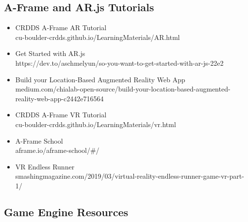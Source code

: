 \documentclass{article}
\begin{document}
\subsection{A-Frame and AR.js Tutorials}
\begin{itemize}
    \item CRDDS A-Frame AR Tutorial\\
    cu-boulder-crdds.github.io/LearningMaterials/AR.html
    \item Get Started with AR.js\\
    https://dev.to/aschmelyun/so-you-want-to-get-started-with-ar-js-22e2
    \item Build your Location-Based Augmented Reality Web App\\
    medium.com/chialab-open-source/build-your-location-based-augmented-reality-web-app-c2442e716564
    \item CRDDS A-Frame VR Tutorial\\
    cu-boulder-crdds.github.io/LearningMaterials/vr.html
    \item A-Frame School\\
    aframe.io/aframe-school/\#/
    \item VR Endless Runner\\
    smashingmagazine.com/2019/03/virtual-reality-endless-runner-game-vr-part-1/
\end{itemize}

\subsection{Game Engine Resources}
\end{document}
